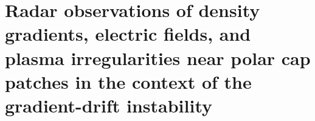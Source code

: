 \chapter{Radar observations of density gradients, electric fields, and plasma irregularities near polar cap patches in the context of the gradient-drift instability}

%
%












